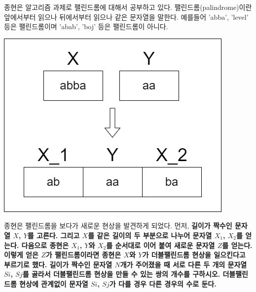 종현은 알고리즘 과제로 팰린드롬에 대해서 공부하고 있다. 팰린드롬(palindrome)이란 앞에서부터 읽으나 뒤에서부터 읽으나 같은 문자열을 말한다. 예를들어 'abba', 'level' 등은 팰린드롬이며 'abab', 'boj' 등은 팰린드롬이 아니다. 

\begin{center}
\includegraphics[bb=0 0 100 200]{draw.png}
\end{center}

종현은 팰린드롬을 보다가 새로운 현상을 발견하게 되었다. 먼저, \bf{길이가 짝수}인 문자열 $X$, $Y$를 고른다. 그리고 $X$를 같은 길이의 두 부분으로 나누어 문자열 $X_1$, $X_2$를 얻는다. 다음으로 종현은 $X_1$, $Y$와 $X_2$를 순서대로 이어 붙여 새로운 문자열 $Z$를 얻는다. 이렇게 얻은 $Z$가 팰린드롬이라면 종현은 $X$와 $Y$가 더블팰린드롬 현상을 일으킨다고 부르기로 했다. 길이가 짝수인 문자열 $N$개가 주어졌을 때 서로 다른 두 개의 문자열 $S{i}$, $S{j}$를 골라서 더블팰린드롬 현상을 만들 수 있는 쌍의 개수를 구하시오. 더블팰린드롬 현상에 관계없이 문자열 $S{i}$, $S{j}$가 다를 경우 다른 경우의 수로 둔다. 
